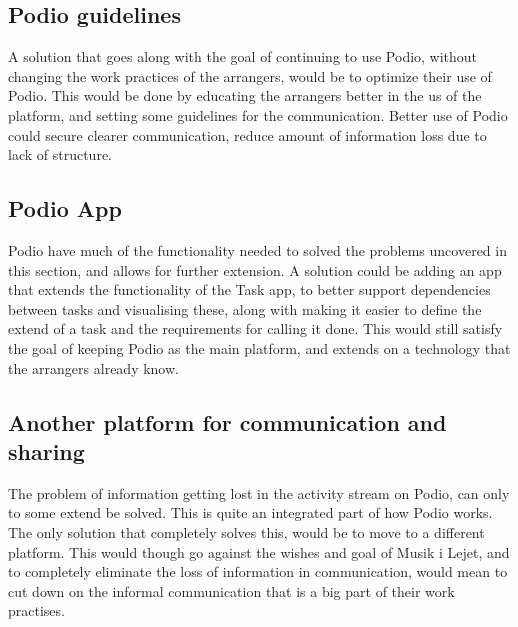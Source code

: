 \subsection{Podio guidelines}
A solution that goes along with the goal of continuing to use Podio, without
changing the work practices of the arrangers, would be to optimize their use of
Podio. This would be done by educating the arrangers better in the us of the platform, and setting some guidelines for the communication. Better use of Podio could secure clearer communication, reduce amount of information loss due to lack of structure.

\subsection{Podio App}
Podio have much of the functionality needed to solved the problems uncovered in
this section, and allows for further extension. A solution could be adding an
app that extends the functionality of the Task app, to better support
dependencies between tasks and visualising these, along with making it easier to
define the extend of a task and the requirements for calling it done. This would
still satisfy the goal of keeping Podio as the main platform, and extends on a
technology that the arrangers already know.

\subsection{Another platform for communication and sharing}
The problem of information getting lost in the activity stream on Podio, can only to some extend be solved. This is quite an integrated part of how Podio works. The only solution that completely solves this, would be to move to a different platform. This would though go against the wishes and goal of Musik i Lejet, and to completely eliminate the loss of information in communication, would mean to cut down on the informal communication that is a big part of their work practises.
